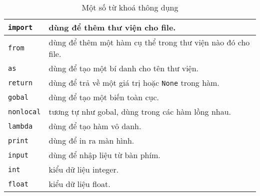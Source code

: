 \begin{table}[h]
\begin{tabular}{|l||l|}
		\texttt{import} & dùng để thêm thư viện cho file.\\
		\hline
		\texttt{from} & dùng để thêm một hàm cụ thể trong thư viện nào đó cho file.\\
		\hline
		\texttt{as} & dùng để tạo một bí danh cho tên thư viện.\\
		\hline
		\texttt{return} & dùng để trả về một giá trị hoặc \texttt{None} trong hàm.\\
		\hline
		\texttt{gobal} & dùng để tạo một biến toàn cục.\\
		\hline
		\texttt{nonlocal} & tương tự như gobal, dùng trong các hàm lồng nhau.\\
		\hline
		\texttt{lambda} & dùng để tạo hàm vô danh.\\
		\hline
		\texttt{print} & dùng để in ra màn hình.\\
		\hline
		\texttt{input} & dùng để nhập liệu từ bàn phím.\\
		\hline
		\texttt{int} & kiểu dữ liệu integer.\\
		\hline
		\texttt{float} & kiểu dữ liệu float.\\
		\hline
	\end{tabular}
	\caption{Một số từ khoá thông dụng}
\end{table}
\newpage
